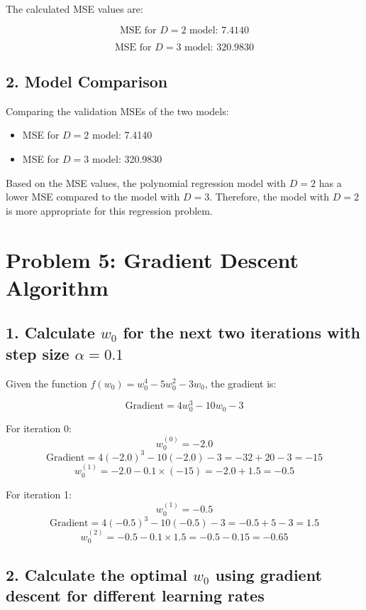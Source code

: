 \documentclass[a4paper,10pt]{article}
\begin{document}
The calculated MSE values are:

\[
\text{MSE for } D=2 \text{ model: } 7.4140
\]

\[
\text{MSE for } D=3 \text{ model: } 320.9830
\]

\subsection*{2. Model Comparison}

Comparing the validation MSEs of the two models:

\begin{itemize}
    \item MSE for \( D=2 \) model: 7.4140
    \item MSE for \( D=3 \) model: 320.9830
\end{itemize}

Based on the MSE values, the polynomial regression model with \( D=2 \) has a lower MSE compared to the model with \( D=3 \). Therefore, the model with \( D=2 \) is more appropriate for this regression problem.

\newpage
\section*{Problem 5: Gradient Descent Algorithm}

\subsection*{1. Calculate $w_0$ for the next two iterations with step size $\alpha = 0.1$}

Given the function \( f(w_0) = w_0^4 - 5w_0^2 - 3w_0 \), the gradient is:

\[
\text{Gradient} = 4w_0^3 - 10w_0 - 3
\]

For iteration 0:
\[
w_0^{(0)} = -2.0
\]
\[
\text{Gradient} = 4(-2.0)^3 - 10(-2.0) - 3 = -32 + 20 - 3 = -15
\]
\[
w_0^{(1)} = -2.0 - 0.1 \times (-15) = -2.0 + 1.5 = -0.5
\]

For iteration 1:
\[
w_0^{(1)} = -0.5
\]
\[
\text{Gradient} = 4(-0.5)^3 - 10(-0.5) - 3 = -0.5 + 5 - 3 = 1.5
\]
\[
w_0^{(2)} = -0.5 - 0.1 \times 1.5 = -0.5 - 0.15 = -0.65
\]

\subsection*{2. Calculate the optimal $w_0$ using gradient descent for different learning rates}
\end{document}

